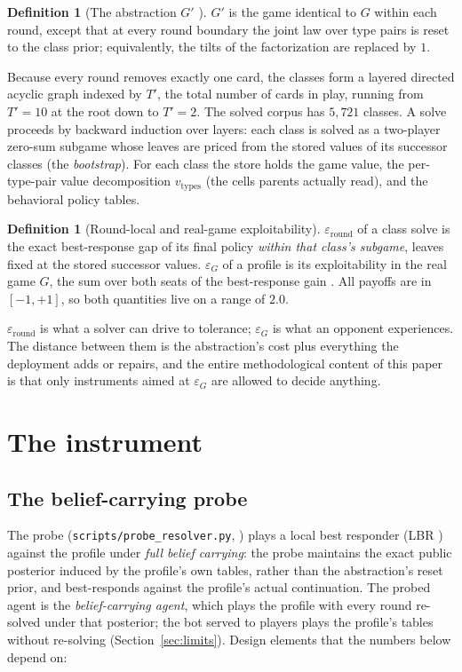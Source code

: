 \documentclass[11pt]{article}
\theoremstyle{plain}
\theoremstyle{definition}
\newtheorem{definition}[theorem]{Definition}
\theoremstyle{remark}
\newcommand{\code}[1]{\texttt{\small #1}}
\newcommand{\game}{\ensuremath{G}}
\newcommand{\gp}{\ensuremath{G'}}
\newcommand{\epsG}{\ensuremath{\varepsilon_{\game}}}
\newcommand{\epsround}{\ensuremath{\varepsilon_{\mathrm{round}}}}
\newcommand{\vtypes}{\ensuremath{v_{\mathrm{types}}}}
\begin{document}
\begin{definition}[The abstraction $\gp$ \cite{rb1,rb2}]\label{def:gp}
$\gp$ is the game identical to $\game$ within each round, except that at
every round boundary the joint law over type pairs is reset to the class
prior; equivalently, the tilts of the factorization are replaced by $1$.
\end{definition}

Because every round removes exactly one card, the classes form a layered
directed acyclic graph indexed by $T'$, the total number of cards in
play, running from $T'=10$ at the root down to $T'=2$. The solved corpus
has $5{,}721$ classes. A solve proceeds by backward induction over
layers: each class is solved as a two-player zero-sum subgame whose
leaves are priced from the stored values of its successor classes (the
\emph{bootstrap}). For each class the store holds the game value, the
per-type-pair value decomposition $\vtypes$ (the cells parents actually
read), and the behavioral policy tables.

\begin{definition}[Round-local and real-game exploitability]
\label{def:eps}
$\epsround$ of a class solve is the exact best-response gap of its final
policy \emph{within that class's subgame}, leaves fixed at the stored
successor values. $\epsG$ of a profile is its exploitability in the
real game $\game$, the sum over both seats of the best-response gain
\cite{rb2,rb3}. All payoffs are in $[-1,+1]$, so both quantities live
on a range of $2.0$.
\end{definition}

$\epsround$ is what a solver can drive to tolerance; $\epsG$ is what an
opponent experiences. The distance between them is the abstraction's
cost plus everything the deployment adds or repairs, and the entire
methodological content of this paper is that only instruments aimed at
$\epsG$ are allowed to decide anything.

\section{The instrument}\label{sec:instrument}

\subsection{The belief-carrying probe}

The probe (\code{scripts/probe\_resolver.py}, \cite{rb3}) plays a local
best responder (LBR \cite{lisy2017}) against the profile under
\emph{full belief carrying}: the probe maintains the exact public
posterior induced by the profile's own tables, rather than the
abstraction's reset prior, and best-responds against the profile's
actual continuation. The probed agent is the \emph{belief-carrying
agent}, which plays the profile with every round re-solved under that
posterior; the bot served to players plays the profile's tables
without re-solving (Section~\ref{sec:limits}). Design elements that
the numbers below depend on:
\end{document}
